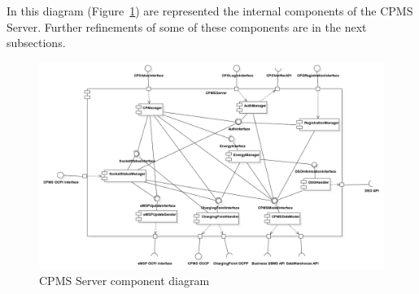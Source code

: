\documentclass{Configuration_Files/PoliMi3i_thesis}
\begin{document}
In this diagram (Figure~\ref{fig:cpms-server}) are represented the internal components of the CPMS Server. Further refinements of some of these components are in the next subsections. 

\begin{figure}[H]
    \centering
    \includegraphics[width=1\textwidth]{Images/component/CPMSServer.jpg}
    \caption{CPMS Server component diagram}
    \label{fig:cpms-server}
\end{figure}
\end{document}
